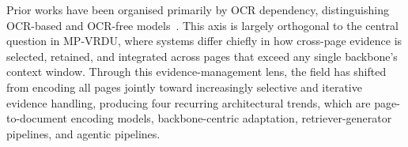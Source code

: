 \documentclass[11pt]{article}
\begin{document}
Prior works have been organised primarily by OCR dependency, distinguishing OCR-based and OCR-free models~\citep{ding2025survey}. This axis is largely orthogonal to the central question in MP-VRDU, where systems differ chiefly in how cross-page evidence is selected, retained, and integrated across pages that exceed any single backbone's context window. Through this evidence-management lens, the field has shifted from encoding all pages jointly toward increasingly selective and iterative evidence handling, producing four recurring architectural trends, which are page-to-document encoding models, backbone-centric adaptation, retriever-generator pipelines, and agentic pipelines.


\end{document}
